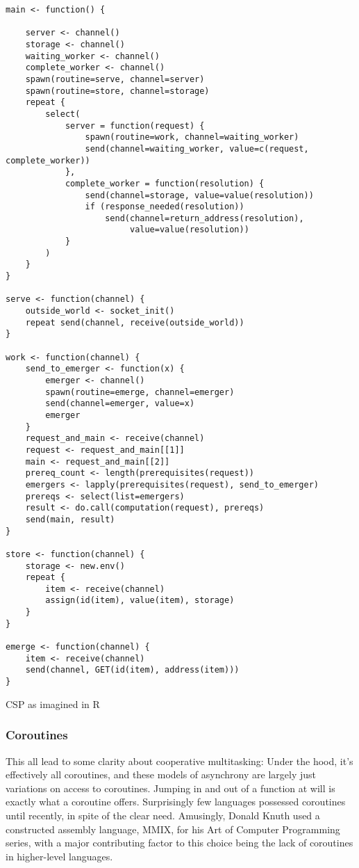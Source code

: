 \begin{listing}
\begin{verbatim}
main <- function() {

    server <- channel()
    storage <- channel()
    waiting_worker <- channel()
    complete_worker <- channel()
    spawn(routine=serve, channel=server)
    spawn(routine=store, channel=storage)
    repeat {
        select(
            server = function(request) {
                spawn(routine=work, channel=waiting_worker)
                send(channel=waiting_worker, value=c(request, complete_worker))
            },
            complete_worker = function(resolution) {
                send(channel=storage, value=value(resolution))
                if (response_needed(resolution))
                    send(channel=return_address(resolution),
                         value=value(resolution))
            }
        )
    }
}

serve <- function(channel) {
    outside_world <- socket_init()
    repeat send(channel, receive(outside_world))
}

work <- function(channel) {
    send_to_emerger <- function(x) {
        emerger <- channel()
        spawn(routine=emerge, channel=emerger)
        send(channel=emerger, value=x)
        emerger
    }
    request_and_main <- receive(channel)
    request <- request_and_main[[1]]
    main <- request_and_main[[2]]
    prereq_count <- length(prerequisites(request))
    emergers <- lapply(prerequisites(request), send_to_emerger)
    prereqs <- select(list=emergers)
    result <- do.call(computation(request), prereqs)
    send(main, result)
}

store <- function(channel) {
    storage <- new.env()
    repeat {
        item <- receive(channel)
        assign(id(item), value(item), storage)
    }
}

emerge <- function(channel) {
    item <- receive(channel)
    send(channel, GET(id(item), address(item)))
}
\end{verbatim}
\caption{CSP as imagined in R}
\label{lst:csp}
\end{listing}

\subsubsection{Coroutines}

This all lead to some clarity about cooperative multitasking: Under the hood, it's effectively all coroutines, and these models of asynchrony are largely just variations on access to coroutines.
Jumping in and out of a function at will is exactly what a coroutine offers.
Surprisingly few languages possessed coroutines until recently, in spite of the clear need.
Amusingly, Donald Knuth used a constructed assembly language, MMIX, for his Art of Computer Programming series, with a major contributing factor to this choice being the lack of coroutines in higher-level languages\cite{knuth1}.

